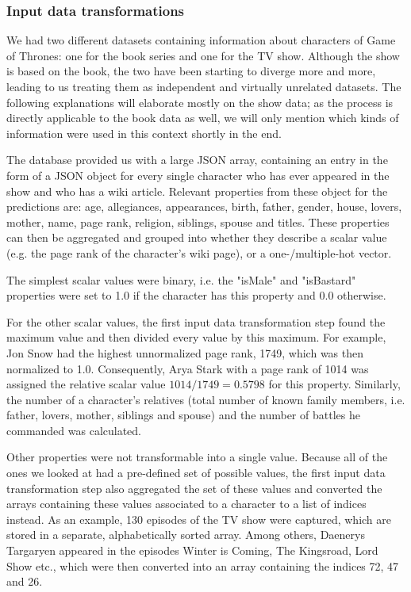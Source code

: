 \documentclass{bioinfo}
\begin{document}
\subsubsection{Input data transformations}

We had two different datasets containing information about characters of Game of Thrones: one for the book series and one for the TV show. Although the show is based on the book, the two have been starting to diverge more and more, leading to us treating them as independent and virtually unrelated datasets. The following explanations will elaborate mostly on the show data; as the process is directly applicable to the book data as well, we will only mention which kinds of information were used in this context shortly in the end.

The database provided us with a large JSON array, containing an entry in the form of a JSON object for every single character who has ever appeared in the show and who has a wiki article. Relevant properties from these object for the predictions are: age, allegiances, appearances, birth, father, gender, house, lovers, mother, name, page rank, religion, siblings, spouse and titles. These properties can then be aggregated and grouped into whether they describe a scalar value (e.g. the page rank of the character's wiki page), or a one-/multiple-hot vector.

The simplest scalar values were binary, i.e. the "isMale" and "isBastard" properties were set to 1.0 if the character has this property and 0.0 otherwise.

For the other scalar values, the first input data transformation step found the maximum value and then divided every value by this maximum. For example, Jon Snow had the highest unnormalized page rank, 1749, which was then normalized to 1.0. Consequently, Arya Stark with a page rank of 1014 was assigned the relative scalar value $1014/1749=0.5798$ for this property. Similarly, the number of a character's relatives (total number of known family members, i.e. father, lovers, mother, siblings and spouse) and the number of battles he commanded was calculated.

Other properties were not transformable into a single value. Because all of the ones we looked at had a pre-defined set of possible values, the first input data transformation step also aggregated the set of these values and converted the arrays containing these values associated to a character to a list of indices instead. As an example, 130 episodes of the TV show were captured, which are stored in a separate, alphabetically sorted array. Among others, Daenerys Targaryen appeared in the episodes Winter is Coming, The Kingsroad, Lord Show etc., which were then converted into an array containing the indices 72, 47 and 26.
\end{document}
